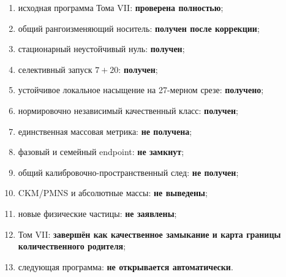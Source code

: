 \begin{protocol}
\begin{enumerate}
 \item исходная программа Тома VII: \textbf{проверена полностью};
 \item общий рангоизменяющий носитель: \textbf{получен после коррекции};
 \item стационарный неустойчивый нуль: \textbf{получен};
 \item селективный запуск $7+20$: \textbf{получен};
 \item устойчивое локальное насыщение на 27-мерном срезе:
 \textbf{получено};
 \item нормировочно независимый качественный класс: \textbf{получен};
 \item единственная массовая метрика: \textbf{не получена};
 \item фазовый и семейный endpoint: \textbf{не замкнут};
 \item общий калибровочно-пространственный след: \textbf{не получен};
 \item CKM/PMNS и абсолютные массы: \textbf{не выведены};
 \item новые физические частицы: \textbf{не заявлены};
 \item Том VII: \textbf{завершён как качественное замыкание и карта
 границы количественного родителя};
 \item следующая программа: \textbf{не открывается автоматически}.
\end{enumerate}
\end{protocol}